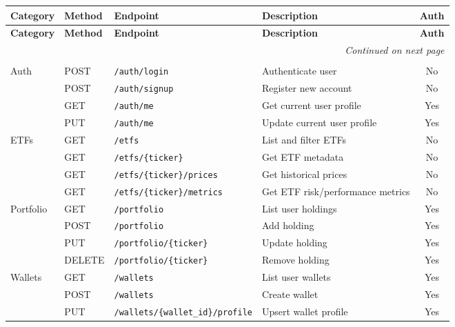 {\scriptsize  %
\setlength{\LTpre}{6pt}
\setlength{\LTpost}{6pt}

\begin{longtable}{p{1.2cm} p{1.2cm} p{4.8cm} p{4.8cm} c}

\toprule
\textbf{Category} & \textbf{Method} & \textbf{Endpoint} & \textbf{Description} & \textbf{Auth} \\
\midrule
\endfirsthead

\toprule
\textbf{Category} & \textbf{Method} & \textbf{Endpoint} & \textbf{Description} & \textbf{Auth} \\
\midrule
\endhead

\midrule
\multicolumn{5}{r}{\textit{Continued on next page}} \\
\endfoot

\bottomrule
\\[-2pt]

Auth & POST & \texttt{/auth/login} & Authenticate user & No \\
 & POST & \texttt{/auth/signup} & Register new account & No \\
 & GET & \texttt{/auth/me} & Get current user profile & Yes \\
 & PUT & \texttt{/auth/me} & Update current user profile & Yes \\

\midrule
ETFs & GET & \texttt{/etfs} & List and filter ETFs & No \\
 & GET & \texttt{/etfs/\{ticker\}} & Get ETF metadata & No \\
 & GET & \texttt{/etfs/\{ticker\}/prices} & Get historical prices & No \\
 & GET & \texttt{/etfs/\{ticker\}/metrics} & Get ETF risk/performance metrics & No \\

\midrule
Portfolio & GET & \texttt{/portfolio} & List user holdings & Yes \\
 & POST & \texttt{/portfolio} & Add holding & Yes \\
 & PUT & \texttt{/portfolio/\{ticker\}} & Update holding & Yes \\
 & DELETE & \texttt{/portfolio/\{ticker\}} & Remove holding & Yes \\

\midrule
Wallets & GET & \texttt{/wallets} & List user wallets & Yes \\
 & POST & \texttt{/wallets} & Create wallet & Yes \\
 & PUT & \texttt{/wallets/\{wallet\_id\}/profile} & Upsert wallet profile & Yes \\


\end{longtable}}
